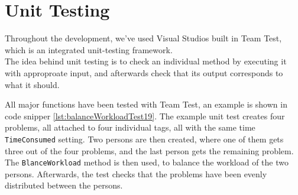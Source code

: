 \chapter{Unit Testing}
\label{chap:testing}

Throughout the development, we've used Visual Studios built in Team Test, which is an integrated unit-testing framework. \cite{teamtest} \\
The idea behind unit testing is to check an individual method by executing it with approproate input, and afterwards check that its output corresponds to what it should.

All major functions have been tested with Team Test, an example is shown in code snipper \ref{lst:balanceWorkloadTest19}. The example unit test creates four problems, all attached to four individual tags, all with the same time \verb+TimeConsumed+ setting. Two persons are then created, where one of them gets three out of the four problems, and the last person gets the remaining problem. The \verb+BlanceWorkload+ method is then used, to balance the workload of the two persons. Afterwards, the test checks that the problems have been evenly distributed between the persons.


